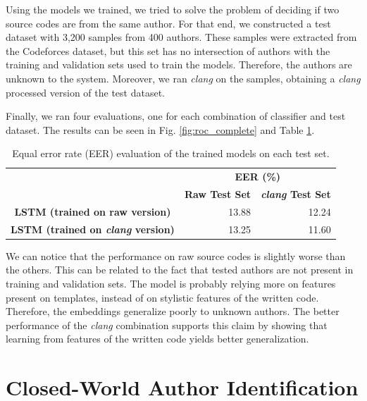 Using the models we trained, we tried to solve the problem of deciding if two source codes are from the same author. For that end, we constructed a test dataset with 3,200 samples from 400 authors. These samples were extracted from the Codeforces dataset, but this set has no intersection of authors with the training and validation sets used to train the models. Therefore, the authors are unknown to the system. Moreover, we ran \textit{clang} on the samples, obtaining a \textit{clang} processed version of the test dataset.

Finally, we ran four evaluations, one for each combination of classifier and test dataset. The results can be seen in Fig. \ref{fig:roc_complete} and  Table \ref{tab:matching}.

\begin{table}[ht]
	\centering
	\begin{tabular}{ccr}
		\cline{2-3}
		\multicolumn{1}{l}{}                     & \multicolumn{2}{c}{\textbf{EER (\%)}}                                   \\ \cline{2-3} 
		\textbf{}                                & \textbf{Raw Test Set}     & \multicolumn{1}{l}{\textbf{\textit{clang} Test Set}} \\ \hline
		\textbf{LSTM (trained on raw version)}   & \multicolumn{1}{r}{13.88} & 12.24                                       \\ \hline
		\textbf{LSTM (trained on \textit{clang} version)} & \multicolumn{1}{r}{13.25} & 11.60                                        \\ \hline
	\end{tabular}
	\caption{Equal error rate (EER) evaluation of the trained models on each test set.}
	\label{tab:matching}
\end{table}

We can notice that the performance on raw source codes is slightly worse than the others. This can be related to the fact that tested authors are not present in training and validation sets. The model is probably relying more on features present on templates, instead of on stylistic features of the written code. Therefore, the embeddings generalize poorly to unknown authors. The better performance of the \textit{clang} combination supports this claim by showing that learning from features of the written code yields better generalization.

\section{Closed-World Author Identification}



